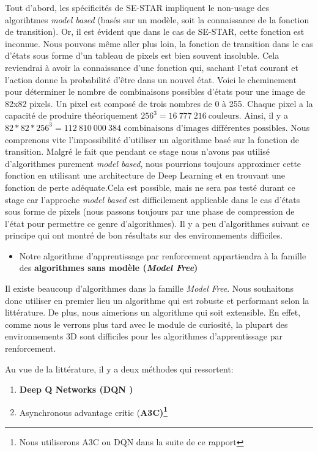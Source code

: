 Tout d'abord, les spécificités de SE-STAR impliquent le non-usage des algorihtmes \emph{model based} (basés sur un modèle, soit la connaissance de la fonction de transition). Or, il est évident que dans le cas de SE-STAR, cette fonction est inconnue. Nous pouvons même aller plus loin, la fonction de transition dans le cas d'états sous forme d'un tableau de pixels est bien souvent insoluble. Cela reviendrai à avoir la connaissance d'une fonction qui, sachant l'etat courant et l'action donne la probabilité d'être dans un nouvel état. Voici le cheminement pour déterminer le nombre de combinaisons possibles d'états pour une image de 82x82 pixels. Un pixel est composé de trois nombres de 0 à 255. Chaque pixel a la capacité de produire théoriquement $256^3 = 16\ 777\ 216\ \text{couleurs}$. Ainsi, il y a $82 * 82 * 256^3 = 112\ 810\ 000\ 384 \text{ combinaisons d'images différentes possibles}$. Nous comprenons vite l'impossibilité d'utiliser un algorithme basé sur la fonction de transition. Malgré le fait que pendant ce stage nous n'avons pas utilisé d'algorithmes purement \emph{model based}, nous pourrions toujours approximer cette fonction en utilisant une architecture de Deep Learning et en trouvant une fonction de perte adéquate.Cela est possible, mais ne sera pas testé durant ce stage car l'approche \emph{model based} est difficilement applicable dans le cas d'états sous forme de pixels (nous passons toujours par une phase de compression de l'état pour permettre ce genre d'algorithmes). Il y a peu d'algorithmes suivant ce principe qui ont montré de bon résultats sur des environnements difficiles.

\begin{itemize}
    \item Notre algorithme d'apprentissage par renforcement appartiendra à la famille des \textbf{algorithmes sans modèle (\emph{Model Free})}
\end{itemize}

Il existe beaucoup d'algorithmes dans la famille \emph{Model Free}. Nous souhaitons donc utiliser en premier lieu un algorithme qui est robuste et performant selon la littérature. De plus, nous aimerions un algorithme qui soit extensible. En effet, comme nous le verrons plus tard avec le module de curiosité, la plupart des environnements 3D sont  difficiles pour les algorithmes d'apprentissage par renforcement. 

Au vue de la littérature, il y a deux méthodes qui ressortent:
\begin{enumerate}
\item \bf{Deep Q Networks (DQN} \cite{mnih-dqn-2015})
\item Asynchronous advantage critic (\bf{A3C})\footnote{Nous utiliserons A3C ou DQN dans la suite de ce rapport} \cite{DBLP:journals/corr/MnihBMGLHSK16}
\end{enumerate}

